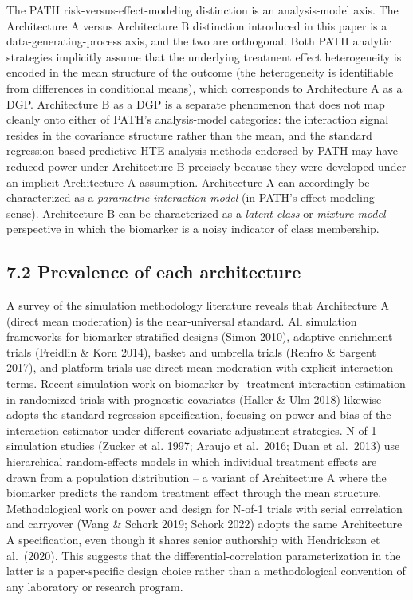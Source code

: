 \documentclass[
]{article}
\begin{document}
The PATH risk-versus-effect-modeling distinction is an
analysis-model axis. The Architecture A versus Architecture B
distinction introduced in this paper is a data-generating-process
axis, and the two are orthogonal. Both PATH analytic strategies
implicitly assume that the underlying treatment effect
heterogeneity is encoded in the mean structure of the outcome
(the heterogeneity is identifiable from differences in
conditional means), which corresponds to Architecture A as a
DGP. Architecture B as a DGP is a separate phenomenon that does
not map cleanly onto either of PATH's analysis-model categories:
the interaction signal resides in the covariance structure
rather than the mean, and the standard regression-based
predictive HTE analysis methods endorsed by PATH may have
reduced power under Architecture B precisely because they were
developed under an implicit Architecture A assumption.
Architecture A can accordingly be characterized as a
\textit{parametric interaction model} (in PATH's effect modeling
sense). Architecture B can be characterized as a \textit{latent
class} or \textit{mixture model} perspective in which the biomarker is
a noisy indicator of class membership.

\subsection{7.2 Prevalence of each architecture}

A survey of the simulation methodology literature reveals that
Architecture A (direct mean moderation) is the near-universal
standard. All simulation frameworks for biomarker-stratified
designs (Simon 2010), adaptive enrichment trials (Freidlin \&
Korn 2014), basket and umbrella trials (Renfro \& Sargent 2017),
and platform trials use direct mean moderation with explicit
interaction terms. Recent simulation work on biomarker-by-
treatment interaction estimation in randomized trials with
prognostic covariates (Haller \& Ulm 2018) likewise adopts the
standard regression specification, focusing on power and bias
of the interaction estimator under different covariate
adjustment strategies. N-of-1 simulation studies (Zucker et al.
1997; Araujo et al.~2016; Duan et al.~2013) use hierarchical
random-effects models in which individual treatment effects are
drawn from a population distribution -- a variant of
Architecture A where the biomarker predicts the random
treatment effect through the mean structure. Methodological
work on power and design for N-of-1 trials with serial
correlation and carryover (Wang \& Schork 2019; Schork 2022)
adopts the same Architecture A specification, even though it
shares senior authorship with Hendrickson et al.~(2020). This
suggests that the differential-correlation parameterization in
the latter is a paper-specific design choice rather than a
methodological convention of any laboratory or research program.
\end{document}
